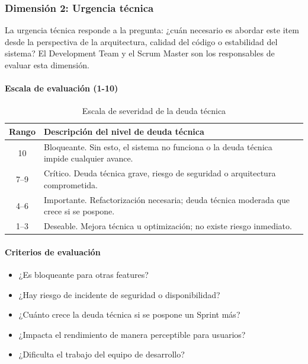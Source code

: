 \FloatBarrier

\subsubsection{Dimensión 2: Urgencia técnica}

La urgencia técnica responde a la pregunta: ¿cuán necesario es abordar este item desde la perspectiva de la arquitectura, calidad del código o estabilidad del sistema? El Development Team y el Scrum Master son los responsables de evaluar esta dimensión.

\paragraph{Escala de evaluación (1-10)}

\begin{table}[h]
    \centering
    \small
    \begin{tabularx}{\textwidth}{|c|X|}
        \hline
        \textbf{Rango} & \textbf{Descripción del nivel de deuda técnica}                                          \\
        \hline
        10             & Bloqueante. Sin esto, el sistema no funciona o la deuda técnica impide cualquier avance. \\
        \hline
        7--9           & Crítico. Deuda técnica grave, riesgo de seguridad o arquitectura comprometida.           \\
        \hline
        4--6           & Importante. Refactorización necesaria; deuda técnica moderada que crece si se pospone.   \\
        \hline
        1--3           & Deseable. Mejora técnica u optimización; no existe riesgo inmediato.                     \\
        \hline
    \end{tabularx}
    \caption{Escala de severidad de la deuda técnica}
    \label{tab:escala-deuda-tecnica}
\end{table}

\FloatBarrier

\paragraph{Criterios de evaluación}

\begin{itemize}
    \item ¿Es bloqueante para otras features?
    \item ¿Hay riesgo de incidente de seguridad o disponibilidad?
    \item ¿Cuánto crece la deuda técnica si se pospone un Sprint más?
    \item ¿Impacta el rendimiento de manera perceptible para usuarios?
    \item ¿Dificulta el trabajo del equipo de desarrollo?
\end{itemize}

